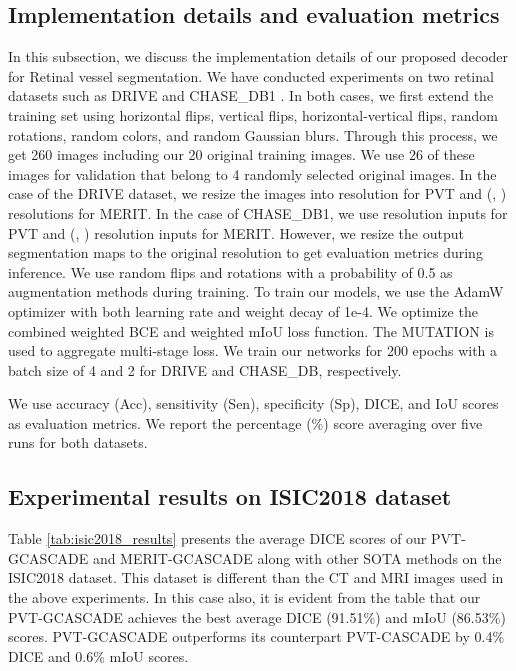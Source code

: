 \documentclass[10pt,twocolumn,letterpaper]{article}
\begin{document}
\subsection{Implementation details and evaluation metrics}
In this subsection, we discuss the implementation details of our proposed decoder for Retinal vessel segmentation.
We have conducted experiments on two retinal datasets such as DRIVE \cite{staal2004ridge} and CHASE\_DB1 \cite{carballal2018automatic}. In both cases, we first extend the training set using horizontal flips, vertical flips, horizontal-vertical flips, random rotations, random colors, and random Gaussian blurs. Through this process, we get 260 images including our 20 original training images. We use 26 of these images for validation that belong to 4 randomly selected original images. In the case of the DRIVE dataset, we resize the images into  resolution for PVT and (, ) resolutions for MERIT. In the case of CHASE\_DB1, we use  resolution inputs for PVT and (, ) resolution inputs for MERIT. However, we resize the output segmentation maps to the original resolution to get evaluation metrics during inference. We use random flips and rotations with a probability of 0.5 as augmentation methods during training. To train our models, we use the AdamW optimizer with both learning rate and weight decay of 1e-4. We optimize the combined weighted BCE and weighted mIoU loss function. The MUTATION is used to aggregate multi-stage loss. We train our networks for 200 epochs with a batch size of 4 and 2 for DRIVE and CHASE\_DB, respectively.  

We use accuracy (Acc), sensitivity (Sen), specificity (Sp), DICE, and IoU scores as evaluation metrics. We report the percentage (\%) score averaging over five runs for both datasets. 
\color{black}

\subsection{Experimental results on ISIC2018 dataset}

Table \ref{tab:isic2018_results}
presents the average DICE scores of our PVT-GCASCADE and MERIT-GCASCADE along with other SOTA methods on the ISIC2018 dataset. This dataset is different than the CT and MRI images used in the above experiments. In this case also, it is evident from the table that our PVT-GCASCADE achieves the best average DICE (91.51\%) and mIoU (86.53\%) scores. PVT-GCASCADE outperforms its counterpart PVT-CASCADE by 0.4\% DICE and 0.6\% mIoU scores.   
\end{document}
